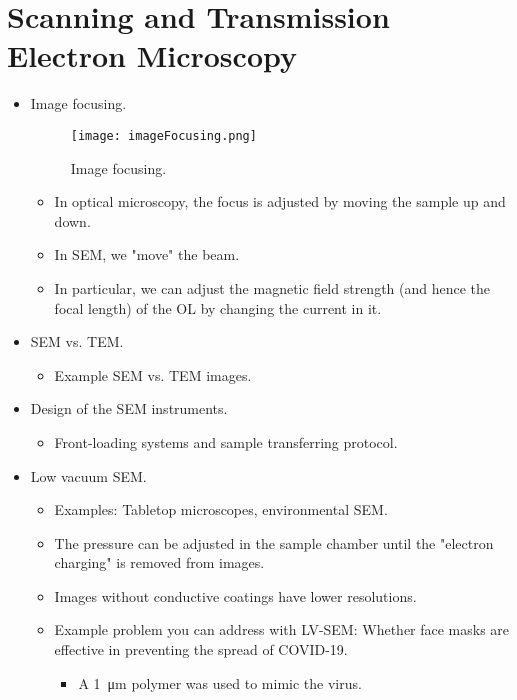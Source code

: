 \documentclass[../notes.tex]{subfiles}
\begin{document}
\section{Scanning and Transmission Electron Microscopy}
\begin{itemize}
    \item {}Image focusing.
    \begin{figure}[h!]
        \centering
        \texttt{[image: imageFocusing.png]}
        \caption{Image focusing.}
        \label{fig:imageFocusing}
    \end{figure}
    \begin{itemize}
        \item In optical microscopy, the focus is adjusted by moving the sample up and down.
        \item In SEM, we "move" the beam.
        \item In particular, we can adjust the magnetic field strength (and hence the focal length) of the OL by changing the current in it.
    \end{itemize}
    \item SEM vs. TEM.
    \begin{itemize}
        \item Example SEM vs. TEM images.
    \end{itemize}
    \item Design of the SEM instruments.
    \begin{itemize}
        \item Front-loading systems and sample transferring protocol.
    \end{itemize}
    \item Low vacuum SEM.
    \begin{itemize}
        \item Examples: Tabletop microscopes, environmental SEM.
        \item The pressure can be adjusted in the sample chamber until the "electron charging" is removed from images.
        \item Images without conductive coatings have lower resolutions.
        \item Example problem you can address with LV-SEM: Whether face masks are effective in preventing the spread of COVID-19.
        \begin{itemize}
            \item A \SI{1}{\micro\meter} polymer was used to mimic the virus.
        \end{itemize}

\end{itemize}
\end{itemize}
\end{document}
